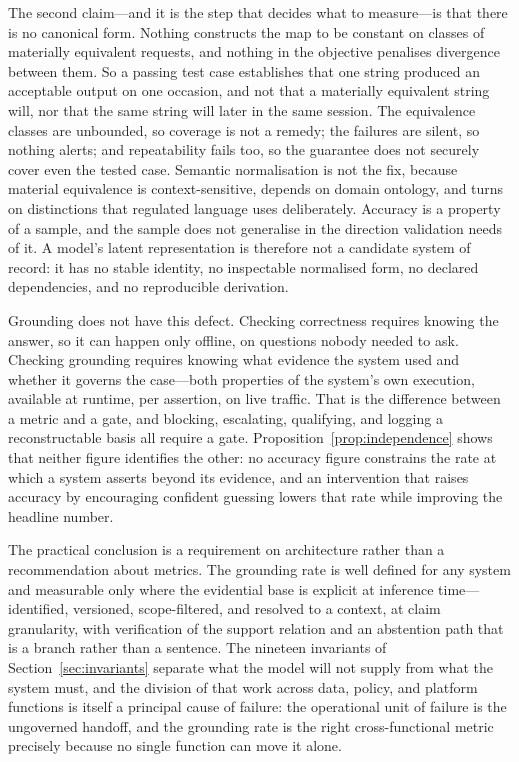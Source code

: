 The second claim---and it is the step that decides what to measure---is that there
is no canonical form. Nothing constructs the map to be constant on classes of materially equivalent
requests, and nothing in the objective penalises divergence between them. So a
passing test case establishes that one string produced an acceptable output on one
occasion, and not that a materially equivalent string will, nor that the same string
will later in the same session. The equivalence classes are unbounded, so coverage
is not a remedy; the failures are silent, so nothing alerts; and repeatability fails
too, so the guarantee does not securely cover even the tested case. Semantic
normalisation is not the fix, because material equivalence is context-sensitive,
depends on domain ontology, and turns on distinctions that regulated language uses
deliberately. Accuracy is a property of a sample, and the sample does not generalise
in the direction validation needs of it. A model's latent representation is
therefore not a candidate system of record: it has no stable identity, no
inspectable normalised form, no declared dependencies, and no reproducible
derivation.

Grounding does not have this defect. Checking correctness requires knowing
the answer, so it can happen only offline, on questions nobody needed to ask.
Checking grounding requires knowing what evidence the system used and whether it
governs the case---both properties of the system's own execution, available at
runtime, per assertion, on live traffic. That is the difference between a metric and
a gate, and blocking, escalating, qualifying, and logging a reconstructable basis all
require a gate. Proposition~\ref{prop:independence} shows that neither figure identifies the other: no accuracy figure constrains the rate at which a
system asserts beyond its evidence, and an intervention that raises accuracy by
encouraging confident guessing lowers that rate while improving the headline number.

The practical conclusion is a requirement on architecture rather than a
recommendation about metrics. The grounding rate is well defined for any system and
measurable only where the evidential base is explicit at inference
time---identified, versioned, scope-filtered, and resolved to a context, at claim
granularity, with verification of the support relation and an abstention path that
is a branch rather than a sentence. The nineteen invariants of
Section~\ref{sec:invariants} separate what the model will not supply from what the
system must, and the division of that work across data, policy, and platform
functions is itself a principal cause of failure: the operational unit of failure is
the ungoverned handoff, and the grounding rate is the right cross-functional metric
precisely because no single function can move it alone.

